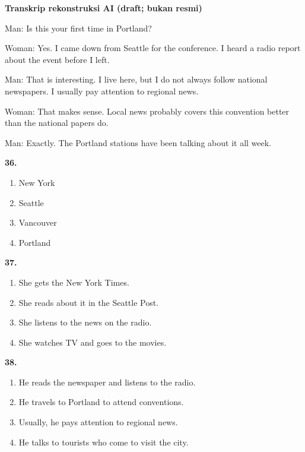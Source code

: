 \documentclass[12pt]{article}
\begin{document}
\par
\vspace{0.25\baselineskip}
\begin{exampleblock}
\textbf{Transkrip rekonstruksi AI (draft; bukan resmi)}\par
Man: Is this your first time in Portland?\par
Woman: Yes. I came down from Seattle for the conference. I heard a radio report about the event before I left.\par
Man: That is interesting. I live here, but I do not always follow national newspapers. I usually pay attention to regional news.\par
Woman: That makes sense. Local news probably covers this convention better than the national papers do.\par
Man: Exactly. The Portland stations have been talking about it all week.\par
\end{exampleblock}
\noindent\textbf{36.}
\begin{enumerate}[label=(\Alph*),leftmargin=*,itemsep=0.2em]
\item New York
\item Seattle
\item Vancouver
\item Portland
\end{enumerate}
\par
\vspace{0.25\baselineskip}
\noindent\textbf{37.}
\begin{enumerate}[label=(\Alph*),leftmargin=*,itemsep=0.2em]
\item She gets the New York Times.
\item She reads about it in the Seattle Post.
\item She listens to the news on the radio.
\item She watches TV and goes to the movies.
\end{enumerate}
\par
\vspace{0.25\baselineskip}
\noindent\textbf{38.}
\begin{enumerate}[label=(\Alph*),leftmargin=*,itemsep=0.2em]
\item He reads the newspaper and listens to the radio.
\item He travels to Portland to attend conventions.
\item Usually, he pays attention to regional news.
\item He talks to tourists who come to visit the city.
\end{enumerate}
\par
\vspace{0.25\baselineskip}
\end{document}
